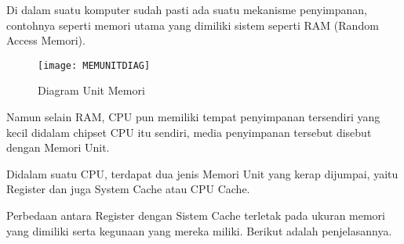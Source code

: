 Di dalam suatu komputer sudah pasti ada suatu mekanisme penyimpanan, contohnya
seperti memori utama yang dimiliki sistem seperti RAM (Random Access Memori).

\begin{figure}[h]
    \centering
    \texttt{[image: MEMUNITDIAG]}
    \caption{Diagram Unit Memori}
    \label{fig:MEMUNITDIAG}
\end{figure}

Namun selain RAM, CPU pun memiliki tempat penyimpanan tersendiri yang kecil didalam
chipset CPU itu sendiri, media penyimpanan tersebut disebut dengan Memori Unit.

Didalam suatu CPU, terdapat dua jenis Memori Unit yang kerap dijumpai,
yaitu Register dan juga System Cache atau CPU Cache.

Perbedaan antara Register dengan Sistem Cache terletak pada ukuran memori yang
dimiliki serta kegunaan yang mereka miliki. Berikut adalah penjelasannya.


